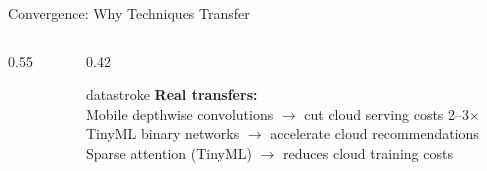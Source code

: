 \documentclass[aspectratio=169, 12pt]{beamer}
\begin{document}
\begin{frame}{Convergence: Why Techniques Transfer}
\begin{columns}[T]
\begin{column}{0.55\textwidth}
    \vspace{0.15cm}
  \end{column}
  \begin{column}{0.42\textwidth}
    \vspace{0.1cm}
    \begin{mlsyscard}{datastroke}
    \textbf{Real transfers:}\\[0.05cm]
    {\footnotesize
    Mobile depthwise convolutions $\to$ cut cloud serving costs 2--3$\times$\\[0.05cm]
    TinyML binary networks $\to$ accelerate cloud recommendations\\[0.05cm]
    Sparse attention (TinyML) $\to$ reduces cloud training costs
    }
    \end{mlsyscard}
  \end{column}
\end{columns}

\end{frame}
\end{document}
